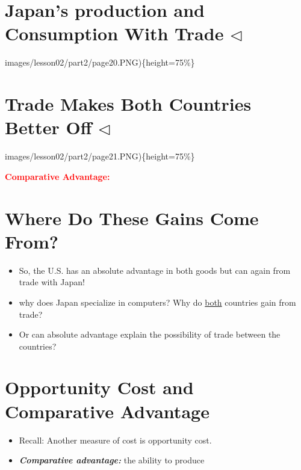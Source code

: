 \documentclass[
]{book}
\begin{document}
\hypertarget{japans-production-and-consumption-with-trade-triangleleft}{%
\section{\texorpdfstring{Japan's production and Consumption With Trade \(\triangleleft\)}{Japan's production and Consumption With Trade \textbackslash triangleleft}}\label{japans-production-and-consumption-with-trade-triangleleft}}

images/lesson02/part2/page20.PNG)\{height=75\%\}

\hypertarget{trade-makes-both-countries-better-off-triangleleft}{%
\section{\texorpdfstring{Trade Makes Both Countries Better Off \(\triangleleft\)}{Trade Makes Both Countries Better Off \textbackslash triangleleft}}\label{trade-makes-both-countries-better-off-triangleleft}}

images/lesson02/part2/page21.PNG)\{height=75\%\}

\textcolor{red}{\textbf{Comparative Advantage:}}

\hypertarget{where-do-these-gains-come-from}{%
\section{Where Do These Gains Come From?}\label{where-do-these-gains-come-from}}

\begin{itemize}
\item
  So, the U.S. has an absolute advantage in both goods but can again from trade with Japan!
\item
  why does Japan specialize in computers? Why do \underline{both} countries gain from trade?
\item
  Or can absolute advantage explain the possibility of trade between the countries?
\end{itemize}

\hypertarget{opportunity-cost-and-comparative-advantage}{%
\section{Opportunity Cost and Comparative Advantage}\label{opportunity-cost-and-comparative-advantage}}

\begin{itemize}
\item
  Recall: Another measure of cost is opportunity cost.
\item
  \textbf{\emph{Comparative advantage:}} the ability to produce
\end{itemize}
\end{document}
